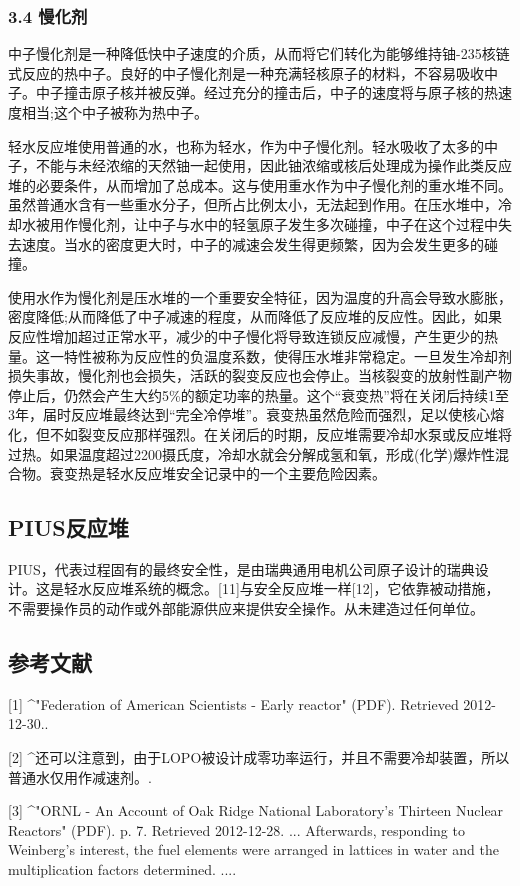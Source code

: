 \subsubsection{3.4 慢化剂}
中子慢化剂是一种降低快中子速度的介质，从而将它们转化为能够维持铀-235核链式反应的热中子。良好的中子慢化剂是一种充满轻核原子的材料，不容易吸收中子。中子撞击原子核并被反弹。经过充分的撞击后，中子的速度将与原子核的热速度相当;这个中子被称为热中子。

轻水反应堆使用普通的水，也称为轻水，作为中子慢化剂。轻水吸收了太多的中子，不能与未经浓缩的天然铀一起使用，因此铀浓缩或核后处理成为操作此类反应堆的必要条件，从而增加了总成本。这与使用重水作为中子慢化剂的重水堆不同。虽然普通水含有一些重水分子，但所占比例太小，无法起到作用。在压水堆中，冷却水被用作慢化剂，让中子与水中的轻氢原子发生多次碰撞，中子在这个过程中失去速度。当水的密度更大时，中子的减速会发生得更频繁，因为会发生更多的碰撞。

使用水作为慢化剂是压水堆的一个重要安全特征，因为温度的升高会导致水膨胀，密度降低;从而降低了中子减速的程度，从而降低了反应堆的反应性。因此，如果反应性增加超过正常水平，减少的中子慢化将导致连锁反应减慢，产生更少的热量。这一特性被称为反应性的负温度系数，使得压水堆非常稳定。一旦发生冷却剂损失事故，慢化剂也会损失，活跃的裂变反应也会停止。当核裂变的放射性副产物停止后，仍然会产生大约5\%的额定功率的热量。这个“衰变热”将在关闭后持续1至3年，届时反应堆最终达到“完全冷停堆”。衰变热虽然危险而强烈，足以使核心熔化，但不如裂变反应那样强烈。在关闭后的时期，反应堆需要冷却水泵或反应堆将过热。如果温度超过2200摄氏度，冷却水就会分解成氢和氧，形成(化学)爆炸性混合物。衰变热是轻水反应堆安全记录中的一个主要危险因素。

\subsection{PIUS反应堆}
PIUS，代表过程固有的最终安全性，是由瑞典通用电机公司原子设计的瑞典设计。这是轻水反应堆系统的概念。[11]与安全反应堆一样[12]，它依靠被动措施，不需要操作员的动作或外部能源供应来提供安全操作。从未建造过任何单位。

\subsection{参考文献}
[1]
^"Federation of American Scientists - Early reactor" (PDF). Retrieved 2012-12-30..

[2]
^还可以注意到，由于LOPO被设计成零功率运行，并且不需要冷却装置，所以普通水仅用作减速剂。.

[3]
^"ORNL - An Account of Oak Ridge National Laboratory's Thirteen Nuclear Reactors" (PDF). p. 7. Retrieved 2012-12-28. ... Afterwards, responding to Weinberg’s interest, the fuel elements were arranged in lattices in water and the multiplication factors determined. ....

